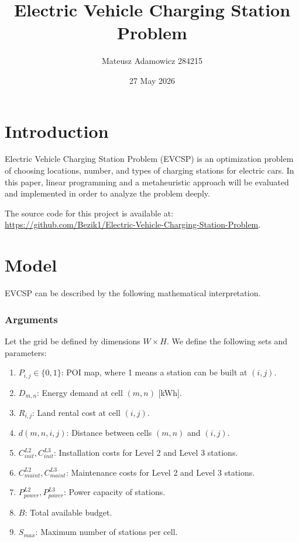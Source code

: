 \documentclass{article}
\title{Electric Vehicle Charging Station Problem}
\author{Mateusz Adamowicz 284215}
\date{27 May 2026}
\begin{document}
\maketitle

\section{Introduction}
Electric Vehicle Charging Station Problem (EVCSP) is an optimization problem of choosing locations, number, and types of charging stations for electric cars. In this paper, linear programming and a metaheuristic approach will be evaluated and implemented in order to analyze the problem deeply.

\bigskip
The source code for this project is available at: \url{https://github.com/Bezik1/Electric-Vehicle-Charging-Station-Problem}.

\section{Model}
EVCSP can be described by the following mathematical interpretation. 

\subsubsection{Arguments}
Let the grid be defined by dimensions $W \times H$. We define the following sets and parameters:

\begin{enumerate}
    \item $P_{i,j} \in \{0, 1\}$: POI map, where 1 means a station can be built at $(i,j)$.
    \item $D_{m,n}$: Energy demand at cell $(m,n)$ [kWh].
    \item $R_{i,j}$: Land rental cost at cell $(i,j)$.
    \item $d(m,n,i,j)$: Distance between cells $(m,n)$ and $(i,j)$.
    \item $C_{init}^{L2}, C_{init}^{L3}$: Installation costs for Level 2 and Level 3 stations.
    \item $C_{maint}^{L2}, C_{maint}^{L3}$: Maintenance costs for Level 2 and Level 3 stations.
    \item $P_{power}^{L2}, P_{power}^{L3}$: Power capacity of stations.
    \item $B$: Total available budget.
    \item $S_{max}$: Maximum number of stations per cell.
\end{enumerate}
\end{document}
